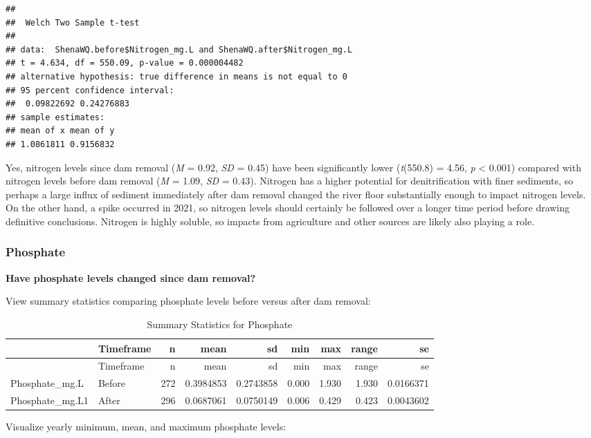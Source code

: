 \documentclass[
  12pt,
]{article}
\begin{document}
\begin{verbatim}
## 
##  Welch Two Sample t-test
## 
## data:  ShenaWQ.before$Nitrogen_mg.L and ShenaWQ.after$Nitrogen_mg.L
## t = 4.634, df = 550.09, p-value = 0.000004482
## alternative hypothesis: true difference in means is not equal to 0
## 95 percent confidence interval:
##  0.09822692 0.24276883
## sample estimates:
## mean of x mean of y 
## 1.0861811 0.9156832
\end{verbatim}

Yes, nitrogen levels since dam removal (\emph{M} = 0.92, \emph{SD} =
0.45) have been significantly lower (\emph{t}(550.8) = 4.56, \emph{p}
\textless{} 0.001) compared with nitrogen levels before dam removal
(\emph{M} = 1.09, \emph{SD} = 0.43). Nitrogen has a higher potential for
denitrification with finer sediments, so perhaps a large influx of
sediment immediately after dam removal changed the river floor
substantially enough to impact nitrogen levels. On the other hand, a
spike occurred in 2021, so nitrogen levels should certainly be followed
over a longer time period before drawing definitive conclusions.
Nitrogen is highly soluble, so impacts from agriculture and other
sources are likely also playing a role.

\newpage

\hypertarget{phosphate}{%
\subsubsection{Phosphate}\label{phosphate}}

\textbf{Have phosphate levels changed since dam removal?}

View summary statistics comparing phosphate levels before versus after
dam removal:

\begin{longtable}[]{@{}llrrrrrrr@{}}
\caption{Summary Statistics for Phosphate}\tabularnewline
\toprule
& Timeframe & n & mean & sd & min & max & range & se \\
\midrule
\endfirsthead
\toprule
& Timeframe & n & mean & sd & min & max & range & se \\
\midrule
\endhead
Phosphate\_mg.L & Before & 272 & 0.3984853 & 0.2743858 & 0.000 & 1.930 &
1.930 & 0.0166371 \\
Phosphate\_mg.L1 & After & 296 & 0.0687061 & 0.0750149 & 0.006 & 0.429 &
0.423 & 0.0043602 \\
\bottomrule
\end{longtable}

Visualize yearly minimum, mean, and maximum phosphate levels:
\end{document}
